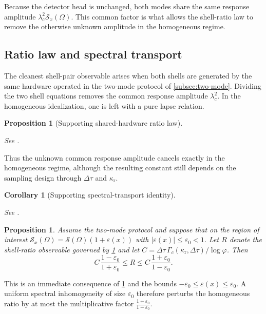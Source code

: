 \documentclass[11pt]{article}
\newtheorem{proposition}[theorem]{Proposition}
\newtheorem{corollary}[theorem]{Corollary}
\theoremstyle{definition}
\begin{document}
Because the detector head is unchanged, both modes share the same response amplitude $\lambda_c^2\mathcal S_x(\Omega)$. This common factor is what allows the shell-ratio law to remove the otherwise unknown amplitude in the homogeneous regime.

\subsection{Ratio law and spectral transport}

The cleanest shell-pair observable arises when both shells are generated by the same hardware operated in the two-mode protocol of \cref{subsec:two-mode}. Dividing the two shell equations removes the common response amplitude $\lambda_c^2$. In the homogeneous idealization, one is left with a pure lapse relation.

\begin{proposition}[Supporting shared-hardware ratio law]\label{thm:ratio-main}
\leavevmode

See \cite[Theorem~4.28; Corollary~4.29]{MaZhang2026ShellGeometry}.
\end{proposition}

Thus the unknown common response amplitude cancels exactly in the homogeneous regime, although the resulting constant still depends on the sampling design through $\Delta\tau$ and $\kappa_{\mathrm r}$.

\begin{corollary}[Supporting spectral-transport identity]\label{cor:spectral-transport-main}
\leavevmode

See \cite[Corollary~4.29]{MaZhang2026ShellGeometry}.
\end{corollary}

\begin{proposition}\label{prop:spectral-stability}
Assume the two-mode protocol and suppose that on the region of interest $\mathcal S_x(\Omega)=\mathcal S(\Omega)(1+\varepsilon(x))$ with $|\varepsilon(x)|\le\varepsilon_0<1$. Let $R$ denote the shell-ratio observable governed by \cref{cor:spectral-transport-main} and let $C=\Delta\tau\,\Gamma_c(\kappa_{\mathrm r},\Delta\tau)/\log\varphi$. Then
\[
C\,\frac{1-\varepsilon_0}{1+\varepsilon_0}
\le
R
\le
C\,\frac{1+\varepsilon_0}{1-\varepsilon_0}.
\]
\end{proposition}

This is an immediate consequence of \cref{cor:spectral-transport-main} and the bounds $-\varepsilon_0\le \varepsilon(x)\le\varepsilon_0$. A uniform spectral inhomogeneity of size $\varepsilon_0$ therefore perturbs the homogeneous ratio by at most the multiplicative factor $\frac{1+\varepsilon_0}{1-\varepsilon_0}$.
\end{document}
